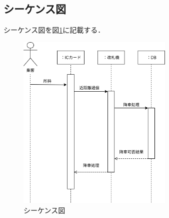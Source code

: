 \documentclass[uplatex]{jsarticle}
\begin{document}
\subsection{シーケンス図}
シーケンス図を図\ref{fig:sequence-diagram}に記載する．
\begin{figure}[htbp]
  \begin{center}
    \includegraphics[clip,width=7.5cm]{figures/sequence-d.png}
    \caption{シーケンス図}
    \label{fig:sequence-diagram}
  \end{center}
\end{figure}
\end{document}

